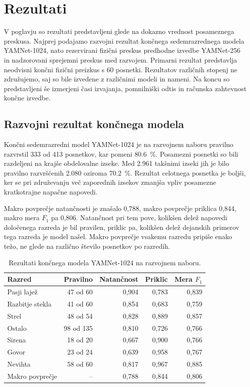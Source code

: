 \chapter{Rezultati}
\label{ch:rezultati}

V poglavju so rezultati predstavljeni glede na dokazno vrednost posameznega
preskusa. Najprej podajamo razvojni rezultat končnega sedemrazrednega modela
YAMNet-1024, nato rezervirani fizični preskus predhodne izvedbe YAMNet-256 in
nadzorovani sprejemni preskus med razvojem. Primarni rezultat predstavlja
neodvisni končni fizični preizkus s 60 posnetki. Rezultatov različnih stopenj
ne združujemo, saj so bile izvedene z različnimi modeli in nameni. Na koncu so
predstavljeni še izmerjeni časi izvajanja,
pomnilniški odtis in računska zahtevnost končne izvedbe.

\section{Razvojni rezultat končnega modela}
\label{sec:rezultati-razvojni}

Končni sedemrazredni model YAMNet-1024 je na razvojnem naboru pravilno
razvrstil 333 od 413 posnetkov, kar pomeni \SI{80.6}{\percent}. Posamezni
posnetki so bili razdeljeni na krajše obdelovalne izseke. Med 2.961 takšnimi
izseki jih je bilo pravilno razvrščenih 2.080 oziroma \SI{70.2}{\percent}.
Rezultat celotnega posnetka je boljši, ker se pri združevanju več zaporednih
izsekov zmanjša vpliv posamezne kratkotrajne napačne napovedi.

Makro povprečje natančnosti je znašalo 0,788, makro povprečje priklica 0,844,
makro mera $F_1$ pa 0,806. Natančnost pri tem pove, kolikšen delež napovedi
določenega razreda je bil pravilen, priklic pa, kolikšen delež dejanskih
primerov tega razreda je model našel. Makro povprečje vsakemu razredu pripiše
enako težo, ne glede na različno število posnetkov po razredih.

\begin{table}[!ht]
  \centering
  \caption{Rezultati končnega modela YAMNet-1024 na razvojnem naboru.}
  \label{tab:razvojni-rezultati-1024}
  \small
  \begin{tabular}{lrrrr}
    \toprule
    Razred & Pravilno & Natančnost & Priklic & Mera $F_1$ \\
    \midrule
    Pasji lajež       & 47 od 60  & 0,904 & 0,783 & 0,839 \\
    Razbitje stekla   & 41 od 60  & 0,854 & 0,683 & 0,759 \\
    Strel             & 48 od 54  & 0,828 & 0,889 & 0,857 \\
    Ostalo            & 98 od 135 & 0,810 & 0,726 & 0,766 \\
    Sirena            & 18 od 20  & 0,667 & 0,900 & 0,766 \\
    Govor             & 23 od 24  & 0,639 & 0,958 & 0,767 \\
    Nevihta           & 58 od 60  & 0,817 & 0,967 & 0,885 \\
    \midrule
    Makro povprečje   & --         & 0,788 & 0,844 & 0,806 \\
    \bottomrule
  \end{tabular}
\end{table}

